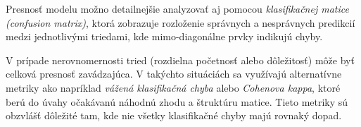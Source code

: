 Presnosť modelu možno detailnejšie analyzovať aj pomocou \textit{klasifikačnej matice (confusion matrix)}, ktorá zobrazuje rozloženie správnych a nesprávnych predikcií medzi jednotlivými triedami, kde mimo-diagonálne prvky indikujú chyby.

V prípade nerovnomernosti tried (rozdielna početnosť alebo dôležitosť) môže byť celková presnosť zavádzajúca. V takýchto situáciách sa využívajú alternatívne metriky ako napríklad \textit{vážená klasifikačná chyba} alebo \textit{Cohenova kappa}, ktoré berú do úvahy očakávanú náhodnú zhodu a štruktúru matice. Tieto metriky sú obzvlášť dôležité tam, kde nie všetky klasifikačné chyby majú rovnaký dopad.
